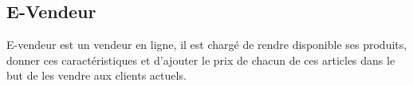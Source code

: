 \subsection{E-Vendeur}

E-vendeur est un vendeur en ligne, il est chargé de rendre disponible ses produits, donner ces caractéristiques et d'ajouter le prix de chacun de ces articles dans le but de les vendre aux clients actuels.